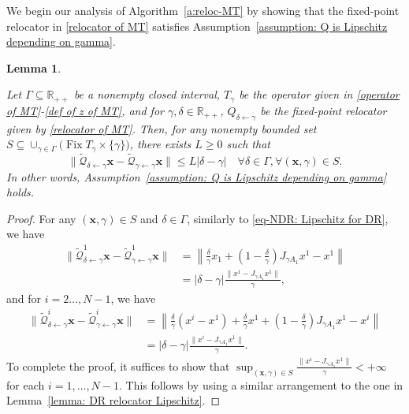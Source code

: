 \documentclass[a4paper,12pt]{article}
\newtheorem{lemma}[theorem]{Lemma}
\DeclareMathOperator{\Fix}{Fix}
\begin{document}
We begin our analysis of Algorithm~\ref{a:reloc-MT} by showing that 
the fixed-point relocator in \eqref{relocator of MT} satisfies Assumption~\ref{assumption: Q is Lipschitz depending on gamma}.
\begin{lemma}\label{lemma: MT relocator Lipschitz}

Let $\Gamma\subseteq\mathbb{R}_{++}$ be a nonempty closed interval, $T_\gamma$ be the operator given in \eqref{operator of MT}-\eqref{def of z of MT}, and for $\gamma,\delta \in \mathbb{R}_{++}$,  $Q_{\delta\leftarrow\gamma}$ be the fixed-point relocator given by \eqref{relocator of MT}. Then, for any nonempty bounded set $S\subseteq\cup_{\gamma\in \Gamma}\bigl(\Fix T_{\gamma}\times\{\gamma\}\bigr)$, there exists $L\geq 0$ such that 
$$ \|\mathcal{\tilde{Q}}_{\delta\leftarrow\gamma}\mathbf{x}-\mathcal{\tilde{Q}}_{\gamma\leftarrow\gamma}\mathbf{x}\| \leq L|\delta-\gamma| \quad\forall\delta\in\Gamma,\forall (\mathbf{x},\gamma)\in S. $$
In other words, Assumption~\ref{assumption: Q is Lipschitz depending on gamma}  holds.
\end{lemma}
\begin{proof}
For any $(\mathbf{x},\gamma)\in S$ and $\delta\in\Gamma$, similarly to \eqref{eq-NDR: Lipschitz for DR}, we have
\begin{equation}\label{eq-NDR: Lipschitz for MT-1}
        \begin{aligned}
            \|\mathcal{\tilde{Q}}^1_{\delta\leftarrow\gamma}\mathbf{x}-\mathcal{\tilde{Q}}^1_{\gamma\leftarrow\gamma}\mathbf{x}\|
            &=\left\|\frac{\delta}{\gamma}x_1+\left(1-\frac{\delta}{\gamma}\right)J_{\gamma A_1}x^1-x^1\right\|\\
            &=|\delta-\gamma|\frac{\|x^1-J_{\gamma A_1}x^1\|}{\gamma},
        \end{aligned}
    \end{equation}
and for $i=2\dots,N-1$, we have    
\begin{equation}\label{eq-NDR: Lipschitz for MT-i}
        \begin{aligned}
            \|\mathcal{\tilde{Q}}^i_{\delta\leftarrow\gamma}\mathbf{x}-\mathcal{\tilde{Q}}^i_{\gamma\leftarrow\gamma}\mathbf{x}\|
            &=\left\|\frac{\delta}{\gamma}(x^i-x^1)+\frac{\delta}{\gamma}x^1+\left(1-\frac{\delta}{\gamma}\right)J_{\gamma A_1}x^1-x^i\right\|\\
            &=|\delta-\gamma|\frac{\|x^i-J_{\gamma A_1}x^1\|}{\gamma}.
        \end{aligned}
    \end{equation}
To complete the proof, it suffices to show that $\sup_{(\mathbf{x},\gamma)\in S}\frac{\|x^i-J_{\gamma A_1}x^1\|}{\gamma}<+\infty$ for each $i=1,\dots,N-1$. This follows by using a similar arrangement to the one in Lemma~\ref{lemma: DR relocator Lipschitz}.
\end{proof}
\end{document}
